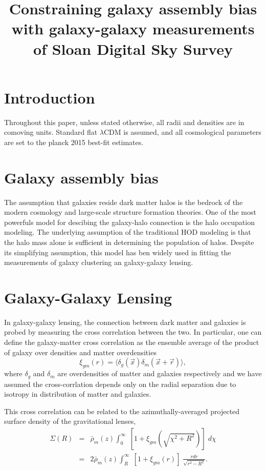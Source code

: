 \documentclass[12pt, preprint]{aastex}
\newcommand{\beq}{\begin{equation}}
\newcommand{\eeq}{\end{equation}}
\begin{document}
\title{Constraining galaxy assembly bias with galaxy-galaxy measurements of Sloan Digital Sky Survey}

\begin{abstract}

\end{abstract}

\section{Introduction}

Throughout this paper, unless stated otherwise, all radii and densities are in comoving units.
Standard flat $\lambda$CDM is assumed, and all cosmological parameters are set to the planck 
2015 best-fit estimates.

\section{Galaxy assembly bias}

The assumption that galaxies reside dark matter halos is the bedrock of the modern cosmology and 
large-scale structure formation theories. One of the most powerfuls model for descibing the galaxy-halo 
connection is the halo occupation modeling. The underlying assumption of the traditional HOD modeling is 
that the halo mass alone is sufficient in determining the population of halos. Despite its simplifying 
assumption, this model has ben widely used in fitting the measurements of galaxy clustering an galaxy-galaxy lensing.

\section{Galaxy-Galaxy Lensing}

In galaxy-galaxy lensing, the connection between dark matter and galaxies is probed by measuring 
the cross correlation between the two. In particular, one can define the galaxy-matter cross correlation 
as the ensemble average of the product of galaxy over densities and matter overdensities
\beq
\xi_{gm}(r) = \langle \delta_{g}(\vec{x}) \delta_{m}(\vec{x}+\vec{r}) \rangle,
\eeq
where $\delta_g$ and $\delta_m$ are overdensities of matter and galaxies respectively and we have 
assumed the cross-corrlation depends only on the radial separation due to isotropy in distribution of matter
and galaxies.

This cross correlation can be related to the azimuthally-averaged  projected surface density of the gravitational
lenses,
\begin{eqnarray}
\Sigma(R) &=& \bar{\rho}_{m}(z)\int_{0}^{\infty} \;  [1 + \xi_{gm}(\sqrt{\chi^2 + R^2})] \; d\chi \nonumber \\
          &=& 2\bar{\rho}_{m}(z)\int_{R}^{\infty} \; [1 + \xi_{gm}(r)] \; \frac{rdr}{\sqrt{r^{2} - R^{2}}}.
\end{eqnarray}
\end{document}
